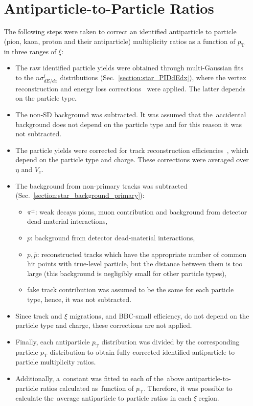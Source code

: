\section{Antiparticle-to-Particle Ratios}\label{section:star_ratios}
The following steps were taken to correct an  identified antiparticle to particle (pion, kaon, proton and their antiparticle) multiplicity ratios as a function of $p_\textrm{T}$ in three ranges of $\xi$:
\begin{itemize}
	\item The raw identified particle yields were obtained through multi-Gaussian fits to the $n\sigma^i_{dE/dx}$ distributions (Sec.~\ref{section:star_PIDdEdx}), where the vertex reconstruction and energy loss corrections~\cite{supplementaryNote} were applied. The latter depends on the particle type.
	\item The non-SD background was subtracted. It was assumed that the~accidental background does not depend on the particle type and for this reason it was not subtracted.
	\item The particle yields were corrected for track reconstruction efficiencies~\cite{supplementaryNote}, which depend on the particle type and charge. These corrections were averaged over $\eta$ and $V_{z}$.
	\item The background from non-primary tracks was subtracted (Sec.~\ref{section:star_background_primary}):
	\begin{itemize}
		\item $\pi^\pm$: weak decays pions, muon contribution and background from  detector dead-material interactions,
		\item $p$: background from  detector dead-material interactions,
		\item $p,\bar{p}$: reconstructed tracks which have the appropriate number of common hit points with true-level particle, but the distance between them is too large (this background is negligibly small for other particle types),
		\item fake track contribution was assumed to be the same for each particle type, hence, it was not subtracted. 
	\end{itemize}
	\item Since  track and $\xi$ migrations, and BBC-small efficiency, do not depend on the particle type and charge, these corrections are not applied.
	\item Finally, each antiparticle $p_\textrm{T}$ distribution was divided by the corresponding particle $p_\textrm{T}$ distribution to obtain fully corrected identified antiparticle to particle multiplicity ratios.
	\item Additionally, a~constant was fitted to each of the~above antiparticle-to-particle ratios calculated  as~function of $p_\textrm{T}$. Therefore, it was possible to calculate the~average antiparticle to particle ratios in each $\xi$ region.
	
\end{itemize}